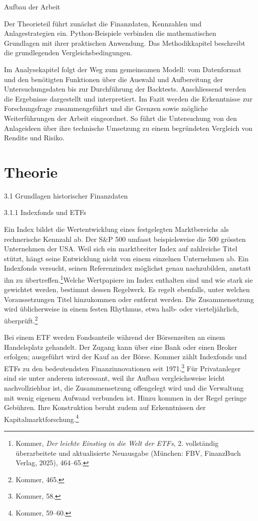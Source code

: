 \documentclass[
  ngerman,
  a4paper,
  DIV=11,
  oneside]{scrreprt}
\begin{document}
Aufbau der Arbeit

Der Theorieteil führt zunächst die Finanzdaten, Kennzahlen und
Anlagestrategien ein. Python-Beispiele verbinden die mathematischen
Grundlagen mit ihrer praktischen Anwendung. Das Methodikkapitel
beschreibt die grundlegenden Vergleichsbedingungen.

Im Analysekapitel folgt der Weg zum gemeinsamen Modell: vom Datenformat
und den benötigten Funktionen über die Auswahl und Aufbereitung der
Untersuchungsdaten bis zur Durchführung der Backtests. Anschliessend
werden die Ergebnisse dargestellt und interpretiert. Im Fazit werden die
Erkenntnisse zur Forschungsfrage zusammengeführt und die Grenzen sowie
mögliche Weiterführungen der Arbeit eingeordnet. So führt die
Untersuchung von den Anlageideen über ihre technische Umsetzung zu einem
begründeten Vergleich von Rendite und Risiko.


\chapter{Theorie}\label{theorie}

3.1 Grundlagen historischer Finanzdaten

3.1.1 Indexfonds und ETFs

Ein Index bildet die Wertentwicklung eines festgelegten Marktbereichs
als rechnerische Kennzahl ab. Der S\&P 500 umfasst beispielsweise die
500 grössten Unternehmen der USA. Weil sich ein marktbreiter Index auf
zahlreiche Titel stützt, hängt seine Entwicklung nicht von einem
einzelnen Unternehmen ab. Ein Indexfonds versucht, seinen Referenzindex
möglichst genau nachzubilden, anstatt ihn zu
übertreffen.\footnote{Kommer, \emph{Der leichte Einstieg in die Welt der
  ETFs}, 2. vollständig überarbeitete und aktualisierte Neuausgabe
  (München: FBV, FinanzBuch Verlag, 2025), 464--65.}Welche Wertpapiere
im Index enthalten sind und wie stark sie gewichtet werden, bestimmt
dessen Regelwerk. Es regelt ebenfalls, unter welchen Voraussetzungen
Titel hinzukommen oder entfernt werden. Die Zusammensetzung wird
üblicherweise in einem festen Rhythmus, etwa halb- oder vierteljährlich,
überprüft.\footnote{Kommer, 465.}

Bei einem ETF werden Fondsanteile während der Börsenzeiten an einem
Handelsplatz gehandelt. Der Zugang kann über eine Bank oder einen Broker
erfolgen; ausgeführt wird der Kauf an der Börse. Kommer zählt Indexfonds
und ETFs zu den bedeutendsten Finanzinnovationen seit 1971.\footnote{Kommer,
  58.} Für Privatanleger sind sie unter anderem interessant, weil ihr
Aufbau vergleichsweise leicht nachvollziehbar ist, die Zusammensetzung
offengelegt wird und die Verwaltung mit wenig eigenem Aufwand verbunden
ist. Hinzu kommen in der Regel geringe Gebühren. Ihre Konstruktion
beruht zudem auf Erkenntnissen der Kapitalmarktforschung.\footnote{Kommer,
  59--60.}
\end{document}
